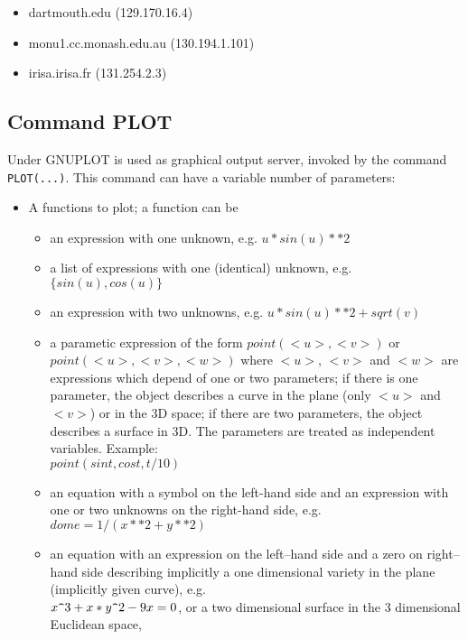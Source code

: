 \begin{itemize}
\item dartmouth.edu (129.170.16.4)
\item monu1.cc.monash.edu.au (130.194.1.101)
\item irisa.irisa.fr (131.254.2.3)
\end{itemize}


\subsection{Command PLOT}

Under {\REDUCE} GNUPLOT is used as graphical output
server, invoked by the command \verb+PLOT(...)+.
This command can have a variable number of
parameters:

\begin{itemize}
\item A functions to plot; a function can be
  \begin{itemize}
    \item an expression with one unknown, e.g. $u*sin(u)**2$

    \item a list of expressions with one (identical) unknown, 
          e.g. $\{sin(u),cos(u)\}$

    \item an expression with two unknowns, e.g. 
          $u*sin(u)**2+sqrt(v)$

    \item a parametic expression  of the form $point(<u>,<v>)$ or
          $point(<u>,<v>,<w>)$ where $<u>$, $<v>$ and $<w>$ are
          expressions which depend of one or two parameters;
          if there is one parameter, the object describes a curve
          in the plane (only $<u>$ and $<v>$) or in the 3D space;
          if there are two parameters, the object describes a
          surface in 3D. The parameters are treated as independent
          variables. Example:\\
                $ point(sin t,cos t,t/10)$

    \item an equation with a symbol on the left-hand side
         and an expression with one or two unknowns on the
         right-hand side, e.g.\\ $dome=1/(x**2+y**2)$

    \item an equation with an expression on the 
         left--hand side and a zero on right--hand side
         describing implicitly a one dimensional 
         variety in the plane (implicitly given curve), e.g.
            \\ $x{\verb+^+}3 + x*y{\verb+^+}2 -9x = 0$, or a two dimensional
         surface in the 3 dimensional Euclidean space,


\end{itemize}
\end{itemize}
